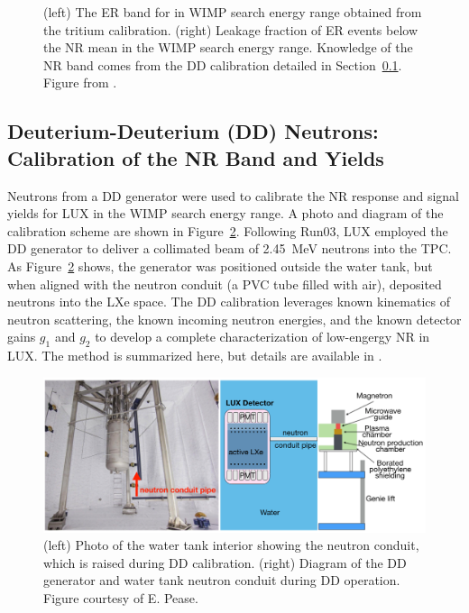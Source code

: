 \begin{figure}[htbp]
\begin{center}
\caption{ (left) The \acs{ER} band for in \acs{WIMP} search energy range obtained from the tritium calibration. (right) Leakage fraction of \acs{ER} events below the \acs{NR} mean in the \acs{WIMP} search energy range. Knowledge of the \acs{NR} band comes from the \acs{DD} calibration detailed in Section~\ref{sec:DD}. Figure from \cite{LUXTritium}.}
\label{fig:tritium2}
\end{center}
\end{figure}

\subsection{Deuterium-Deuterium (DD) Neutrons: Calibration of the NR Band and Yields}
\label{sec:DD}
Neutrons from a \ac{DD} generator were used to calibrate the \ac{NR} response and signal yields for \ac{LUX} in the \ac{WIMP} search energy range. A photo and diagram of the calibration scheme are shown in Figure~\ref{fig:dd_gen}. Following Run03, \ac{LUX} employed the \ac{DD} generator to deliver a collimated beam of 2.45~MeV neutrons into the \ac{TPC}. As Figure~\ref{fig:dd_gen} shows, the generator was positioned outside the water tank, but when aligned with the neutron conduit (a \ac{PVC} tube filled with air), deposited neutrons into the \ac{LXe} space. The \ac{DD} calibration leverages known kinematics of neutron scattering, the known incoming neutron energies, and the known detector gains $g_{1}$ and $g_{2}$ to develop a complete characterization of low-engergy \ac{NR} in \ac{LUX}. The method is summarized here, but details are available in \cite{LUXDD}.

\begin{figure}[htbp]
\begin{center}
\includegraphics[width=\textwidth]{figures/lux/lux_ddgenerator.png}
\caption{(left) Photo of the water tank interior showing the neutron conduit, which is raised during \acs{DD} calibration. (right) Diagram of the \acs{DD} generator and water tank neutron conduit during \acs{DD} operation. Figure courtesy of E. Pease.}
\label{fig:dd_gen}
\end{center}
\end{figure}

